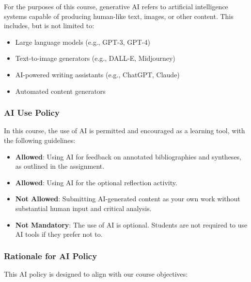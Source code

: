 \documentclass[11pt, letterpaper]{article}
\begin{document}
\noindent For the purposes of this course, generative AI refers to artificial intelligence systems capable of producing human-like text, images, or other content. This includes, but is not limited to:

\begin{itemize}
    \item Large language models (e.g., GPT-3, GPT-4)
    \item Text-to-image generators (e.g., DALL-E, Midjourney)
    \item AI-powered writing assistants (e.g., ChatGPT, Claude)
    \item Automated content generators
\end{itemize}

\subsubsection*{AI Use Policy}

In this course, the use of AI is permitted and encouraged as a learning tool, with the following guidelines:

\begin{itemize}
    \item \textbf{Allowed}: Using AI for feedback on annotated bibliographies and syntheses, as outlined in the assignment.
    \item \textbf{Allowed}: Using AI for the optional reflection activity.
    \item \textbf{Not Allowed}: Submitting AI-generated content as your own work without substantial human input and critical analysis.
    \item \textbf{Not Mandatory}: The use of AI is optional. Students are not required to use AI tools if they prefer not to.
\end{itemize}

\subsubsection*{Rationale for AI Policy}

This AI policy is designed to align with our course objectives:
\end{document}
